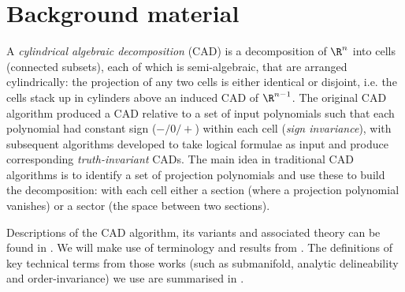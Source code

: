 \documentclass{article}
\newtheorem{example}{Example}
\begin{document}

% 

\section{Background material}

A \emph{cylindrical algebraic decomposition} (CAD) is a decomposition of $\R^n$ into cells (connected subsets), each of which is semi-algebraic, that are arranged cylindrically:  the projection of any two cells is either identical or disjoint, i.e. the cells stack up in cylinders above an induced CAD of $\R^{n-1}$.  The original CAD algorithm produced a CAD relative to a set of input polynomials such that each polynomial had constant sign ($-/0/+$) within each cell (\emph{sign invariance}), with subsequent algorithms developed to take logical formulae as input and produce corresponding \emph{truth-invariant} CADs. The main idea in traditional CAD algorithms is to identify a set of projection polynomials and use these to build the decomposition: with each cell either a section (where a projection polynomial vanishes) or a sector (the space between two sections).

Descriptions of the CAD algorithm, its variants and associated theory
can be found in \cite{ACM1984, Collins1975, CollinsHong1991, McCallum1988, McCallum1998}. We will make use of terminology and results from \cite{McCallum1988, McCallum1998}. The definitions
of key technical terms from those works (such as submanifold, analytic delineability and order-invariance) we use are summarised in \cite{McCallum1999}.
\end{document}
